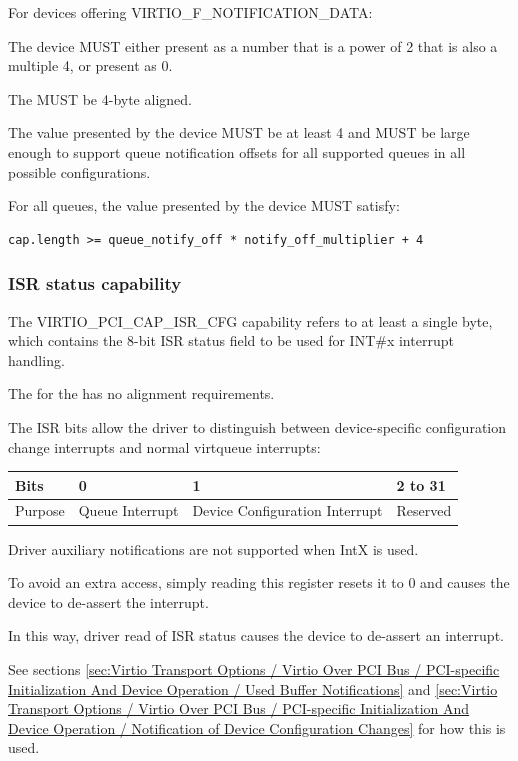 For devices offering VIRTIO_F_NOTIFICATION_DATA:

The device MUST either present  as a
number that is a power of 2 that is also a multiple 4,
or present  as 0.

The  MUST be 4-byte aligned.

The value  presented by the device MUST be at least 4
and MUST be large enough to support queue notification offsets
for all supported queues in all possible configurations.

For all queues, the value  presented by the device MUST satisfy:
\begin{lstlisting}
cap.length >= queue_notify_off * notify_off_multiplier + 4
\end{lstlisting}

\subsubsection{ISR status capability}\label{sec:Virtio Transport Options / Virtio Over PCI Bus / PCI Device Layout / ISR status capability}

The VIRTIO_PCI_CAP_ISR_CFG capability
refers to at least a single byte, which contains the 8-bit ISR status field
to be used for INT\#x interrupt handling.

The  for the  has no alignment requirements.

The ISR bits allow the driver to distinguish between device-specific configuration
change interrupts and normal virtqueue interrupts:

\begin{tabular}{ |l||l|l|l| }
\hline
Bits       & 0                               & 1               &  2 to 31 \\
\hline
Purpose    & Queue Interrupt  & Device Configuration Interrupt & Reserved \\
\hline
\end{tabular}

Driver auxiliary notifications are not supported when IntX is used.

To avoid an extra access, simply reading this register resets it to 0 and
causes the device to de-assert the interrupt.

In this way, driver read of ISR status causes the device to de-assert
an interrupt.

See sections \ref{sec:Virtio Transport Options / Virtio Over PCI Bus / PCI-specific Initialization And Device Operation / Used Buffer Notifications} and \ref{sec:Virtio Transport Options / Virtio Over PCI Bus / PCI-specific Initialization And Device Operation / Notification of Device Configuration Changes} for how this is used.

